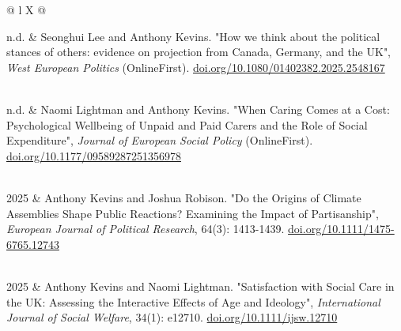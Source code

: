 \documentclass[letterpaper,fontsize=10.5pt]{scrartcl}
\begin{document}
\begin{longtblr}[entry=none,label=none]{@{} l X @{} }
	
	n.d. & Seonghui Lee and Anthony Kevins. "How we think about the political stances of others: evidence on projection from Canada, Germany, and the UK", \textit{West European Politics} (OnlineFirst). \href{https://doi.org/10.1080/01402382.2025.2548167}{doi.org/10.1080/01402382.2025.2548167}

	\\	
	
	n.d. & Naomi Lightman and Anthony Kevins. "When Caring Comes at a Cost: Psychological Wellbeing of Unpaid and Paid Carers and the Role of Social Expenditure", \textit{Journal of European Social Policy} (OnlineFirst). \href{https://doi.org/10.1177/09589287251356978}{doi.org/10.1177/09589287251356978}

	\\
	
	2025 & Anthony Kevins and Joshua Robison. "Do the Origins of Climate Assemblies Shape Public Reactions? Examining the Impact of Partisanship", \textit{European Journal of Political Research}, 64(3): 1413-1439. \href{https://doi.org/10.1111/1475-6765.12743}{doi.org/10.1111/1475-6765.12743}

	\\

	2025 & Anthony Kevins and Naomi Lightman. "Satisfaction with Social Care in the UK: Assessing the Interactive Effects of Age and Ideology", \textit{International Journal of Social Welfare}, 34(1): e12710. \href{https://doi.org/10.1111/ijsw.12710}{doi.org/10.1111/ijsw.12710}

	\\


\end{longtblr}
\end{document}
